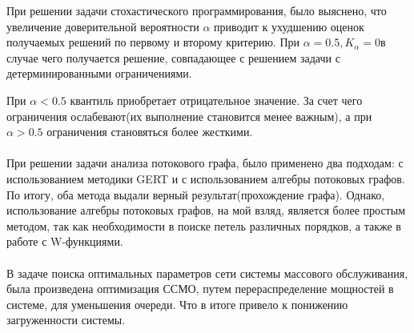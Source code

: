 При решении задачи стохастического программирования, было выяснено, что увеличение доверительной вероятности $\alpha$ приводит к ухудшению оценок получаемых решений по первому и второму критерию. При $\alpha = 0.5, K_{\alpha} = 0$в случае чего получается решение, совпадающее с решением задачи с детерминированными ограничениями. 

При $\alpha < 0.5$ квантиль приобретает отрицательное значение. За счет чего ограничения ослабевают(их выполнение становится менее важным), а при $\alpha > 0.5$ ограничения становяться более жесткими.\\\\
При решении задачи анализа потокового графа, было применено два подходам: с использованием методики GERT и с использованием алгебры потоковых графов. По итогу, оба метода выдали верный результат(прохождение графа). Однако, использование алгебры потоковых графов, на мой взляд, является более простым методом, так как необходимости в поиске петель различных порядков, а также в работе с W-функциями.\\\\
В задаче поиска оптимальных параметров сети системы массового обслуживания, была произведена оптимизация ССМО, путем перераспределение мощностей в системе, для уменьшения очереди. Что в итоге привело к понижению загруженности системы.


%
%


